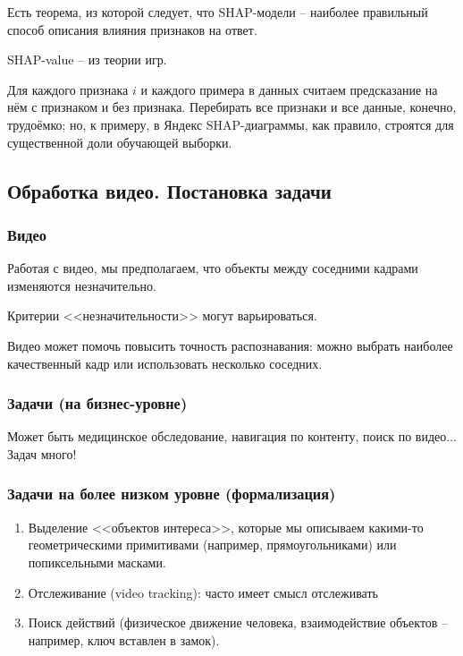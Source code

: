 \documentclass[main.tex]{subfiles}
\begin{document}
Есть теорема, из которой следует, что SHAP-модели -- наиболее правильный способ описания влияния признаков на ответ.

SHAP-value -- из теории игр.

Для каждого признака $ i $ и каждого примера в данных считаем предсказание на нём с признаком и без признака.
Перебирать все признаки и все данные, конечно, трудоёмко; но, к примеру, в Яндекс SHAP-диаграммы, как правило, строятся для существенной доли обучающей выборки.

\subsection{Обработка видео. Постановка задачи}

\subsubsection{Видео}

Работая с видео, мы предполагаем, что объекты между соседними кадрами изменяются незначительно.

Критерии <<незначительности>> могут варьироваться.

Видео может помочь повысить точность распознавания: можно выбрать наиболее качественный кадр или использовать несколько соседних.

\subsubsection{Задачи (на бизнес-уровне)}

Может быть медицинское обследование, навигация по контенту, поиск по видео...
Задач много!

\subsubsection{Задачи на более низком уровне (формализация)}

\begin{enumerate}[noitemsep]
	\item Выделение <<объектов интереса>>, которые мы описываем какими-то геометрическими примитивами (например, прямоугольниками) или попиксельными масками.
	\item Отслеживание (video tracking): часто имеет смысл отслеживать
	\item Поиск действий (физическое движение человека, взаимодействие объектов -- например, ключ вставлен в замок).
\end{enumerate}
\end{document}
